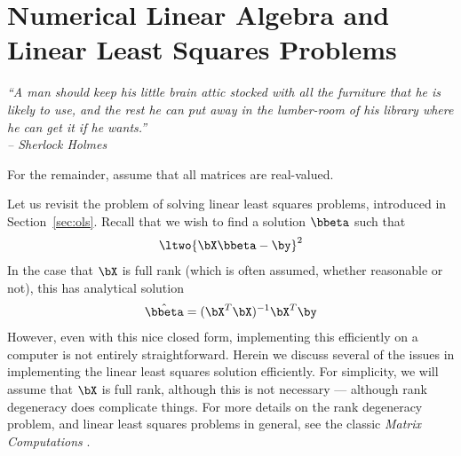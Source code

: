 

\chapter{Numerical Linear Algebra and Linear Least Squares Problems}
\label{apx:numlinalg}


{\it
``A man should keep his little brain attic stocked with all the furniture
that he is likely to use, and the rest he can put away in the lumber-room
of his library where he can get it if he wants.'' \\
\--- Sherlock Holmes
}
\vspace{0.5cm}


For the remainder, assume that all matrices are real-valued.

Let us revisit the problem of solving linear least squares problems, introduced in Section~\ref{sec:ols}.  Recall that we wish to find a solution $\bbeta$ such that
\begin{align*}
\ltwo{ \bX\bbeta - \by }^2
\end{align*}
In the case that $\bX$ is full rank (which is often assumed, whether reasonable or not), this has analytical solution
\begin{align}
 \hat{\bbeta} = (\bX^T\bX)^{-1}\bX^T\by \label{math:ols2}
\end{align}
However, even with this nice closed form, implementing this efficiently on a computer is not entirely straightforward.  Herein we discuss several of the issues in implementing the linear least squares solution efficiently.  For simplicity, we will assume that $\bX$ is full rank, although this is not necessary --- although rank degeneracy does complicate things.  For more details on the rank degeneracy problem, and linear least squares problems in general, see the classic \emph{Matrix Computations} \citep{gvl}.




